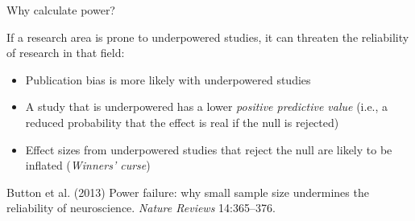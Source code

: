 \documentclass[ignorenonframetext,]{beamer}
\providecommand{\tightlist}{%
  \setlength{\itemsep}{0pt}\setlength{\parskip}{0pt}}
\begin{document}
\begin{frame}{Why calculate power?}

If a research area is prone to underpowered studies, it can threaten the
reliability of research in that field:

\begin{itemize}
\tightlist
\item
  Publication bias is more likely with underpowered studies
\item
  A study that is underpowered has a lower \emph{positive predictive
  value} (i.e., a reduced probability that the effect is real if the
  null is rejected)
\item
  Effect sizes from underpowered studies that reject the null are likely
  to be inflated (\emph{Winners' curse})
\end{itemize}

\footnotesize{Button et al. (2013) Power failure: why small sample size undermines the reliability of neuroscience. \textit{Nature Reviews} 14:365--376.}

\end{frame}
\end{document}
